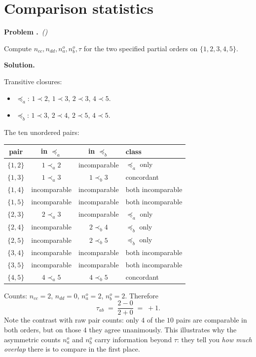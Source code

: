 \documentclass[11pt,a4paper]{article}
\newcounter{problem}
\newenvironment{problem}[1][]{%
  \refstepcounter{problem}%
  \par\medskip\noindent
  \textbf{Problem \theproblem.}\if\relax\detokenize{#1}\relax\else\ \textit{(#1)}\fi\quad\ignorespaces
}{\par\smallskip}
\newenvironment{solution}{%
  \par\noindent\textbf{Solution.}\quad\ignorespaces
}{\par\medskip}
\begin{document}
\section{Comparison statistics}

\begin{problem}
Compute $n_{cc}, n_{dd}, n_a^o, n_b^o, \tau$ for the two specified
partial orders on $\{1, 2, 3, 4, 5\}$.
\end{problem}

\begin{solution}
Transitive closures:
\begin{itemize}[nosep]
\item $\preceq_a$: $1 \prec 2$, $1 \prec 3$, $2 \prec 3$, $4 \prec 5$.
\item $\preceq_b$: $1 \prec 3$, $2 \prec 4$, $2 \prec 5$, $4 \prec 5$.
\end{itemize}
The ten unordered pairs:
\begin{center}
\renewcommand{\arraystretch}{1.05}
\begin{tabular}{c|c|c|l}
pair & in $\preceq_a$ & in $\preceq_b$ & class \\\hline
$\{1, 2\}$ & $1 \prec_a 2$  & incomparable    & $\preceq_a$ only \\
$\{1, 3\}$ & $1 \prec_a 3$  & $1 \prec_b 3$    & concordant \\
$\{1, 4\}$ & incomparable    & incomparable    & both incomparable \\
$\{1, 5\}$ & incomparable    & incomparable    & both incomparable \\
$\{2, 3\}$ & $2 \prec_a 3$  & incomparable    & $\preceq_a$ only \\
$\{2, 4\}$ & incomparable    & $2 \prec_b 4$    & $\preceq_b$ only \\
$\{2, 5\}$ & incomparable    & $2 \prec_b 5$    & $\preceq_b$ only \\
$\{3, 4\}$ & incomparable    & incomparable    & both incomparable \\
$\{3, 5\}$ & incomparable    & incomparable    & both incomparable \\
$\{4, 5\}$ & $4 \prec_a 5$  & $4 \prec_b 5$    & concordant \\
\end{tabular}
\end{center}
Counts: $n_{cc} = 2$, $n_{dd} = 0$, $n_a^o = 2$, $n_b^o = 2$.
Therefore
\[
  \tau_{ab} \;=\; \frac{2 - 0}{2 + 0} \;=\; +1.
\]
Note the contrast with raw pair counts: only $4$ of the $10$ pairs
are comparable in both orders, but on those $4$ they agree
unanimously.  This illustrates why the asymmetric counts $n_a^o$ and
$n_b^o$ carry information beyond $\tau$: they tell you \emph{how
much overlap} there is to compare in the first place.
\end{solution}
\end{document}
